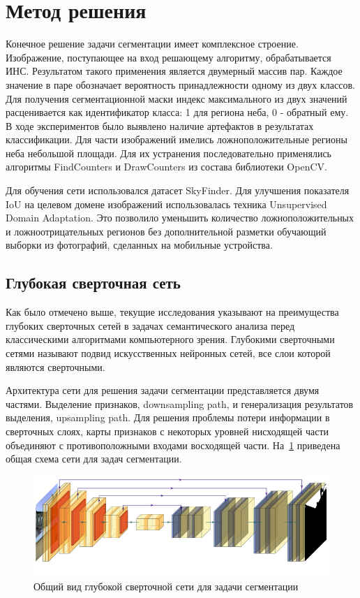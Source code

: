 \section{Метод решения}

Конечное решение задачи сегментации имеет комплексное строение.
Изображение, поступающее на вход решающему алгоритму, обрабатывается ИНС.
Результатом такого применения является двумерный массив пар.
Каждое значение в паре обозначает вероятность принадлежности одному из двух классов.
Для получения сегментационной маски индекс максимального из двух значений расценивается как идентификатор класса: 1 для региона неба, 0 - обратный ему.
В ходе экспериментов было выявлено наличие артефактов в результатах классификации.
Для части изображений имелись ложноположительные регионы неба небольшой площади.
Для их устранения последовательно применялись алгоритмы FindCounters и DrawCounters из состава библиотеки OpenCV.

Для обучения сети использовался датасет SkyFinder.
Для улучшения показателя IoU на целевом домене изображений использовалась техника Unsupervised Domain Adaptation.
Это позволило уменьшить количество ложноположительных и ложноотрицательных регионов без дополнительной разметки обучающий выборки из фотографий,
сделанных на мобильные устройства.

\subsection{Глубокая сверточная сеть}

Как было отмечено выше, текущие исследования указывают на преимущества глубоких сверточных сетей в задачах семантического анализа
перед классическими алгоритмами компьютерного зрения.
Глубокими сверточными сетями называют подвид искусственных нейронных сетей, все слои которой являются сверточными.

Архитектура сети для решения задачи сегментации представляется двумя частями.
Выделение признаков, downsampling path, и генерализация результатов выделения, upsampling path.
Для решения проблемы потери информации в сверточных слоях, карты признаков с некоторых уровней нисходящей части объединяют с противоположными входами восходящей части.
На~\ref{fig:net_arch_common} приведена общая схема сети для задач сегментации.

\begin{figure}[H]
    \centering
    \includegraphics[width=\textwidth]{img/net_arch.png}
    \caption{Общий вид глубокой сверточной сети для задачи сегментации}
    \label{fig:net_arch_common}
\end{figure}

